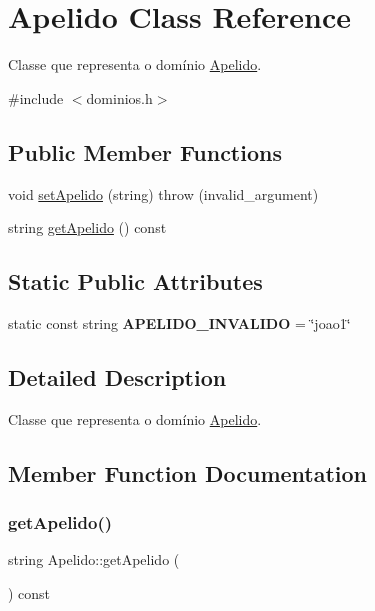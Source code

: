 \hypertarget{classApelido}{}\section{Apelido Class Reference}
\label{classApelido}


Classe que representa o domínio \hyperlink{classApelido}{Apelido}.  




{\ttfamily \#include $<$dominios.\+h$>$}

\subsection*{Public Member Functions}
\begin{DoxyCompactItemize}
\item 
void \hyperlink{classApelido_a2cb01229e3c1120858ef6c1f692432da}{set\+Apelido} (string)  throw (invalid\+\_\+argument)
\item 
string \hyperlink{classApelido_af3547459a5aff2cd4d6e2befe69ffe12}{get\+Apelido} () const
\end{DoxyCompactItemize}
\subsection*{Static Public Attributes}
\begin{DoxyCompactItemize}
\item 
\mbox{\label{classApelido_a4ae7b6274f323470d1d3dc2e11f762d0}} 
static const string {\bfseries A\+P\+E\+L\+I\+D\+O\+\_\+\+I\+N\+V\+A\+L\+I\+DO} = \char`\"{}joao1\char`\"{}
\end{DoxyCompactItemize}


\subsection{Detailed Description}
Classe que representa o domínio \hyperlink{classApelido}{Apelido}. 

\subsection{Member Function Documentation}
\mbox{\label{classApelido_af3547459a5aff2cd4d6e2befe69ffe12}} 
\subsubsection{\texorpdfstring{get\+Apelido()}{getApelido()}}
{\footnotesize\ttfamily string Apelido\+::get\+Apelido (\begin{DoxyParamCaption}{ }\end{DoxyParamCaption}) const\hspace{0.3cm}{\ttfamily [inline]}}


